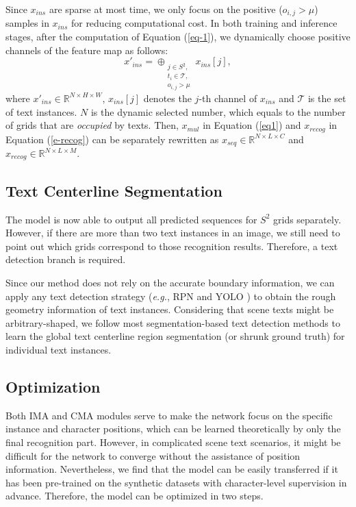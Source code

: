 \documentclass[letterpaper]{article} \usepackage{aaai21}  \usepackage{times}  \usepackage{helvet} \usepackage{courier}  \usepackage[hyphens]{url}  \usepackage{graphicx} \urlstyle{rm} \def\UrlFont{\rm}  \usepackage{natbib}  \usepackage{caption} \frenchspacing  \setlength{\pdfpagewidth}{8.5in}  \setlength{\pdfpageheight}{11in}  \usepackage{multirow}
\begin{document}
Since $x_{ins}$ are sparse at most time, we only focus on the positive ($o_{i,j}$$>$$\mu$) samples in $x_{ins}$ for reducing computational cost. In both training and inference stages, after the computation of Equation (\ref{eq-1}), we dynamically choose positive channels of the feature map as follows:
\begin{equation}
x'_{ins} = \oplus_{\substack{j \in S^2, \\ t_i \in \mathcal{T}, \\ o_{i,j}>\mu}} x_{ins}[j],
\label{eq0}
\end{equation}
where $x'_{ins} \in \mathbb{R}^{N\times H \times W}$, $x_{ins}[j]$ denotes the $j$-th channel of $x_{ins}$ and $\mathcal{T}$ is the set of text instances. $N$ is the dynamic selected number, which equals to the number of grids that are \emph{occupied} by texts.
Then, $x_{mul}$ in Equation (\ref{eq1}) and $x_{recog}$ in Equation (\ref{e-recog}) can be separately rewritten as $x_{seq} \in \mathbb{R}^{N\times L \times C}$ and $x_{recog} \in \mathbb{R}^{N\times L \times M}$.


\subsection{Text Centerline Segmentation}
The model is now able to output all predicted sequences for $S^2$ grids separately. However, if there are more than two text instances in an image, we still need to point out which grids correspond to those recognition results. Therefore, a text detection branch is required.

Since our method does not rely on the accurate boundary information, we can apply any text detection strategy (\emph{e.g.}, RPN \cite{2015Faster} and YOLO \cite{Redmon2016You}) to obtain the rough geometry information of text instances.
Considering that scene texts might be arbitrary-shaped, we follow most segmentation-based text detection methods \cite{long2018textsnake, Wang2019Shape} to learn the global text centerline region segmentation (or shrunk ground truth) for individual text instances.

\subsection{Optimization}
Both IMA and CMA modules serve to make the network focus on the specific instance and character positions, which can be learned theoretically by only the final recognition part.
However, in complicated scene text scenarios,  it might be difficult for the network to converge without the assistance of position information.
Nevertheless, we find that the model can be easily transferred if it has been pre-trained on the synthetic datasets with character-level supervision in advance. Therefore, the model can be optimized in two steps.
\end{document}
